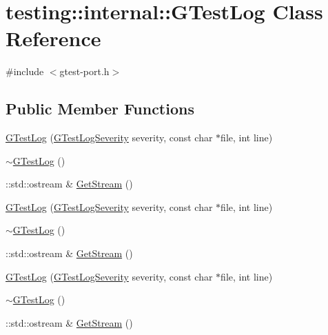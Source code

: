 \hypertarget{classtesting_1_1internal_1_1_g_test_log}{}\section{testing\+::internal\+::G\+Test\+Log Class Reference}
\label{classtesting_1_1internal_1_1_g_test_log}


{\ttfamily \#include $<$gtest-\/port.\+h$>$}

\subsection*{Public Member Functions}
\begin{DoxyCompactItemize}
\item 
\mbox{\hyperlink{classtesting_1_1internal_1_1_g_test_log_a364691bf972983a59cfa2891062a64af}{G\+Test\+Log}} (\mbox{\hyperlink{namespacetesting_1_1internal_aa6255ef3b023c5b4e1a2198d887fb977}{G\+Test\+Log\+Severity}} severity, const char $\ast$file, int line)
\item 
\mbox{\hyperlink{classtesting_1_1internal_1_1_g_test_log_a978a099703bbaa0f380216e8d7ee03d3}{$\sim$\+G\+Test\+Log}} ()
\item 
\+::std\+::ostream \& \mbox{\hyperlink{classtesting_1_1internal_1_1_g_test_log_aebb92e67d98eca69f0347d5121dab27a}{Get\+Stream}} ()
\item 
\mbox{\hyperlink{classtesting_1_1internal_1_1_g_test_log_a364691bf972983a59cfa2891062a64af}{G\+Test\+Log}} (\mbox{\hyperlink{namespacetesting_1_1internal_aa6255ef3b023c5b4e1a2198d887fb977}{G\+Test\+Log\+Severity}} severity, const char $\ast$file, int line)
\item 
\mbox{\hyperlink{classtesting_1_1internal_1_1_g_test_log_a978a099703bbaa0f380216e8d7ee03d3}{$\sim$\+G\+Test\+Log}} ()
\item 
\+::std\+::ostream \& \mbox{\hyperlink{classtesting_1_1internal_1_1_g_test_log_aebb92e67d98eca69f0347d5121dab27a}{Get\+Stream}} ()
\item 
\mbox{\hyperlink{classtesting_1_1internal_1_1_g_test_log_a364691bf972983a59cfa2891062a64af}{G\+Test\+Log}} (\mbox{\hyperlink{namespacetesting_1_1internal_aa6255ef3b023c5b4e1a2198d887fb977}{G\+Test\+Log\+Severity}} severity, const char $\ast$file, int line)
\item 
\mbox{\hyperlink{classtesting_1_1internal_1_1_g_test_log_a978a099703bbaa0f380216e8d7ee03d3}{$\sim$\+G\+Test\+Log}} ()
\item 
\+::std\+::ostream \& \mbox{\hyperlink{classtesting_1_1internal_1_1_g_test_log_aebb92e67d98eca69f0347d5121dab27a}{Get\+Stream}} ()
\end{DoxyCompactItemize}
